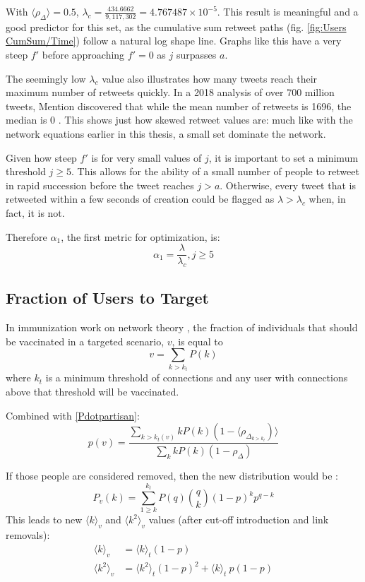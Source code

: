\documentclass[preprint,review,12pt]{elsarticle}
\begin{document}
With $\langle \rho_{\Delta} \rangle = 0.5$, $\lambda_c = \frac{434.6662}{9,117,302}=4.767487\times 10^{-5}$. This result is meaningful and a good predictor for this set, as the cumulative sum retweet paths (fig. \ref{fig:Users CumSum/Time}) follow a natural log shape line. Graphs like this have a very steep $f'$ before approaching $f' = 0$ as $j$ surpasses $a$. 

The seemingly low $\lambda_c$ value also illustrates how many tweets reach their maximum number of retweets quickly. In a 2018 analysis of over 700 million tweets, Mention discovered that while the mean number of retweets is 1696, the median is 0 \citep{mention2018twitter}. This shows just how skewed retweet values are: much like with the network equations earlier in this thesis, a small set dominate the network.

Given how steep $f'$ is for very small values of $j$, it is important to set a minimum threshold $j \geq 5$. This allows for the ability of a small number of people to retweet in rapid succession before the tweet reaches $j > a$. Otherwise, every tweet that is retweeted within a few seconds of creation could be flagged as $\lambda > \lambda_c$ when, in fact, it is not.

Therefore $\alpha_1$, the first metric for optimization, is:
\begin{equation}
    \label{alpha1}
    \alpha_1 = \frac{\lambda}{\lambda_c}, j\geq 5
\end{equation}

\subsection{Fraction of Users to Target}
In immunization work on network theory \citep{pastor2002immunization}, the fraction of individuals that should be vaccinated in a targeted scenario, $v$, is equal to 
\begin{equation}
    v = \sum_{k > k_t}P(k)
\end{equation}
where $k_t$ is a minimum threshold of connections and any user with connections above that threshold will be vaccinated. 

Combined with \ref{Pdotpartisan}:
\begin{equation}
\label{probability of vaccinated}
p(v) = \frac{\sum_{k>k_t(v)}kP(k)(1-\langle \rho_{\Delta_{k>k_t}})\rangle}{\sum_{k}kP(k)(1-\rho_{\Delta})}
\end{equation}

If those people are considered removed, then the new distribution would be \citep{cohen2001breakdown}:
\begin{equation}
    P_v(k) = \sum_{1\geq k}^{k_t}P(q)\binom{q}{k}(1-p)^kp^{q-k}
\end{equation}
This leads to new $\langle k \rangle_v$ and $\langle k^2 \rangle_v$ values (after cut-off introduction and link removals)\citep{pastor2002immunization}: 
\begin{align*}
        \langle k \rangle_v &= \langle k \rangle_t(1-p)\\
         \langle k^2 \rangle_v &= \langle k^2 \rangle_t(1-p)^2+\langle k \rangle_t\ p(1-p)
\end{align*}
\end{document}
